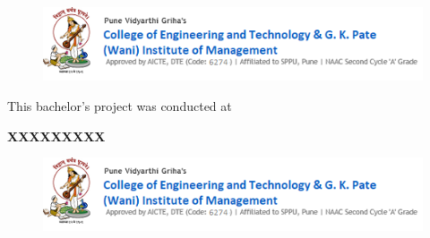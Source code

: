 \begin{flushleft}
\begin{figure}[b!]
\includegraphics[scale = 1.2]{Figures/pvgcoet-logo.png}
\end{figure}
\end{flushleft}
\clearpage\mbox{}\clearpage
\vspace*{19cm}

\noindent\begin{minipage}{0.6\textwidth}
This bachelor's project was conducted at
\bigskip

{\gugcblue \textbf{XXXXXXXXX}} %
\end{minipage}\hfill 
\newline
\begin{minipage}{0.6\textwidth}
\begin{figure}[H]
\includegraphics[scale = 1.0]{Figures/pvgcoet-logo.png}%
\end{figure}
\end{minipage} 
\clearpage\mbox{}\clearpage
